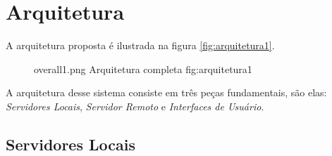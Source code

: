 \chapter{Arquitetura}
\label{arq-sec:arquitetura}

A arquitetura proposta é ilustrada na figura \ref{fig:arquitetura1}.
\begin{figure}[h!]
    {overall1.png}
    {Arquitetura completa}
    {fig:arquitetura1}
\end{figure}

A arquitetura desse sistema consiste em três peças fundamentais, são elas: 
\emph{Servidores Locais}, \emph{Servidor Remoto} e \emph{Interfaces de Usuário}.

\section{Servidores Locais}
\label{arq-sec:servidores-locais}

